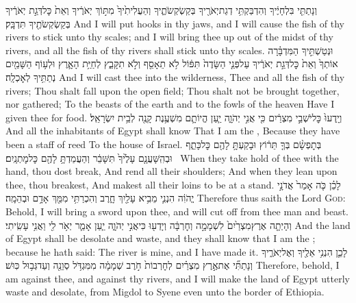 {וְנָתַתִּ֤י  בִּלְחָיֶ֔יךָ וְהִדְבַּקְתִּ֥י דְגַת\maqqaf יְאֹרֶ֖יךָ בְּקַשְׂקְשֹׂתֶ֑יךָ וְהַעֲלִיתִ֙יךָ֙ מִתּ֣וֹךְ יְאֹרֶ֔יךָ וְאֵת֙ כׇּל\maqqaf דְּגַ֣ת יְאֹרֶ֔יךָ בְּקַשְׂקְשֹׂתֶ֖יךָ תִּדְבָּֽק׃}
{And I will put hooks in thy jaws, and I will cause the fish of thy rivers to stick unto thy scales; and I will bring thee up out of the midst of thy rivers, and all the fish of thy rivers shall stick unto thy scales.}
{וּנְטַשְׁתִּ֣יךָ הַמִּדְבָּ֗רָה אוֹתְךָ֙ וְאֵת֙ כׇּל\maqqaf דְּגַ֣ת יְאֹרֶ֔יךָ עַל\maqqaf פְּנֵ֤י הַשָּׂדֶה֙ תִּפּ֔וֹל לֹ֥א תֵאָסֵ֖ף וְלֹ֣א תִקָּבֵ֑ץ לְחַיַּ֥ת הָאָ֛רֶץ וּלְע֥וֹף הַשָּׁמַ֖יִם נְתַתִּ֥יךָ לְאׇכְלָֽה׃}
{And I will cast thee into the wilderness, Thee and all the fish of thy rivers; Thou shalt fall upon the open field; Thou shalt not be brought together, nor gathered; To the beasts of the earth and to the fowls of the heaven Have I given thee for food.}
{וְיָֽדְעוּ֙ כׇּל\maqqaf יֹשְׁבֵ֣י מִצְרַ֔יִם כִּ֖י אֲנִ֣י יְהֹוָ֑ה יַ֧עַן הֱיוֹתָ֛ם מִשְׁעֶ֥נֶת קָנֶ֖ה לְבֵ֥ית יִשְׂרָאֵֽל׃}
{And all the inhabitants of Egypt shall know That I am the \lord, Because they have been a staff of reed To the house of Israel.}
{בְּתׇפְשָׂ֨ם בְּךָ֤  תֵּר֔וֹץ וּבָקַעְתָּ֥ לָהֶ֖ם כׇּל\maqqaf כָּתֵ֑ף וּבְהִֽשָּׁעֲנָ֤ם עָלֶ֙יךָ֙ תִּשָּׁבֵ֔ר וְהַעֲמַדְתָּ֥ לָהֶ֖ם כׇּל\maqqaf מׇתְנָֽיִם׃ \setuma }
{When they take hold of thee with the hand, thou dost break, And rend all their shoulders; And when they lean upon thee, thou breakest, And makest all their loins to be at a stand.}
{לָכֵ֗ן כֹּ֤ה אָמַר֙ אֲדֹנָ֣י יֱהֹוִ֔ה הִנְנִ֛י מֵבִ֥יא עָלַ֖יִךְ חָ֑רֶב וְהִכְרַתִּ֥י מִמֵּ֖ךְ אָדָ֥ם וּבְהֵמָֽה׃}
{Therefore thus saith the Lord \textsc{God}: Behold, I will bring a sword upon thee, and will cut off from thee man and beast.}
{וְהָיְתָ֤ה אֶרֶץ\maqqaf מִצְרַ֙יִם֙ לִשְׁמָמָ֣ה וְחׇרְבָּ֔ה וְיָדְע֖וּ כִּי\maqqaf אֲנִ֣י יְהֹוָ֑ה יַ֧עַן אָמַ֛ר יְאֹ֥ר לִ֖י וַאֲנִ֥י עָשִֽׂיתִי׃}
{And the land of Egypt shall be desolate and waste, and they shall know that I am the \lord; because he hath said: The river is mine, and I have made it.}
{לָכֵ֛ן הִנְנִ֥י אֵלֶ֖יךָ וְאֶל\maqqaf יְאֹרֶ֑יךָ וְנָתַתִּ֞י אֶת\maqqaf אֶ֣רֶץ מִצְרַ֗יִם לְחׇרְבוֹת֙ חֹ֣רֶב שְׁמָמָ֔ה מִמִּגְדֹּ֥ל סְוֵנֵ֖ה וְעַד\maqqaf גְּב֥וּל כּֽוּשׁ׃}
{Therefore, behold, I am against thee, and against thy rivers, and I will make the land of Egypt utterly waste and desolate, from Migdol to Syene even unto the border of Ethiopia.}
